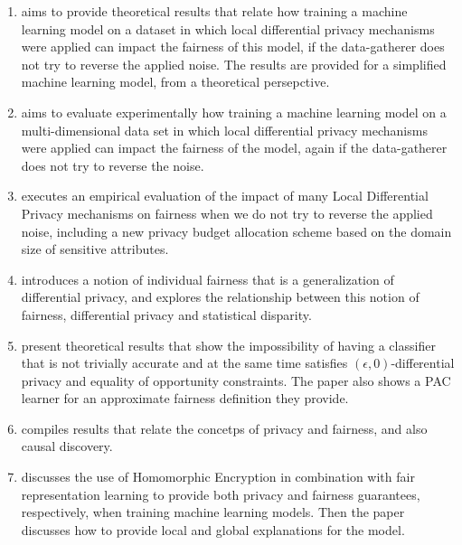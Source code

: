 \begin{enumerate}
\item \cite{A Systematic and Formal Study of the Impact of Local Differential Privacy on Fairness: Preliminary Results} aims to provide theoretical results that relate how training a machine learning model on a dataset in which local differential privacy mechanisms were applied can impact the fairness of this model, if the data-gatherer does not try to reverse the applied noise. The results are provided for a simplified machine learning model, from a theoretical persepctive.
\item \cite{On the impact of multi-dimensional local differential privacy on fairness} aims to evaluate experimentally how training a machine learning model on a multi-dimensional data set in which local differential privacy mechanisms were applied can impact the fairness of the model, again if the data-gatherer does not try to reverse the noise.
\item \cite{(Local) Differential Privacy has NO Disparate Impact on Fairness} executes an empirical evaluation of the impact of many Local Differential Privacy mechanisms on fairness when we do not try to reverse the applied noise, including a new privacy budget allocation scheme based on the domain size of sensitive attributes.
\item \cite{Awareness} introduces a notion of individual fairness that is a generalization of differential privacy, and explores the relationship between this notion of fairness, differential privacy and statistical disparity.
\item \cite{On the Compatibility of Privacy and Fairness} present theoretical results that show the impossibility of having a classifier that is not trivially accurate and at the same time satisfies $(\epsilon,0)$-differential privacy and equality of opportunity constraints. The paper also shows a PAC learner for an approximate fairness definition they provide.
\item \cite{Exploring fairness and privacy in machine learning} compiles results that relate the concetps of privacy and fairness, and also causal discovery.
\item \cite{Toward Learning Trustworthily from Data Combining Privacy, Fairness, and Explainability: An Application to Face Recognition} discusses the use of Homomorphic Encryption in combination with fair representation learning \cite{Learning fair representations} to provide both privacy and fairness guarantees, respectively, when training machine learning models. Then the paper discusses how to provide local and global explanations for the model.
\end{enumerate}

